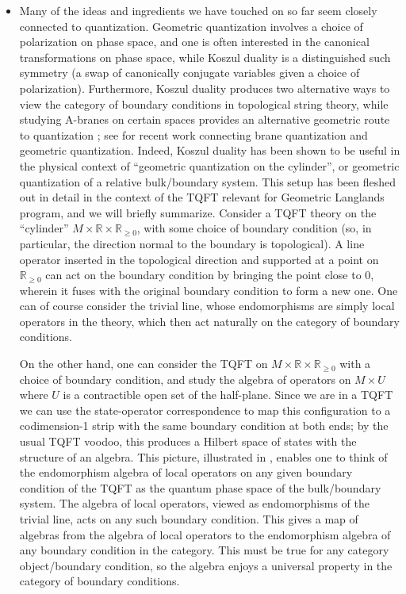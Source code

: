 \documentclass[11pt]{amsart}
\begin{document}
\begin{itemize}
\item Many of the ideas and ingredients we have touched on so far seem closely connected to quantization. Geometric quantization involves a choice of polarization on phase space, and one is often interested in the canonical transformations on phase space, while Koszul duality is a distinguished such symmetry (a swap of canonically conjugate variables given a choice of polarization). Furthermore, Koszul duality produces two alternative ways to view the category of boundary conditions in topological string theory, while studying A-branes on certain spaces provides an alternative geometric route to quantization \cite{GukovWitten}; see \cite{GW} for recent work connecting brane quantization and geometric quantization. Indeed, Koszul duality has been shown to be useful in the physical context of ``geometric quantization on the cylinder'', or geometric quantization of a relative bulk/boundary system. This setup has been fleshed out in detail \cite{EY} in the context of the TQFT relevant for Geometric Langlands program, and we will briefly summarize. Consider a TQFT theory on the ``cylinder'' $M \times \mathbb{R} \times \mathbb{R}_{\geq 0}$, with some choice of boundary condition (so, in particular, the direction normal to the boundary is topological). A line operator inserted in the topological direction and supported at a point on $\mathbb{R}_{\geq 0}$ can act on the boundary condition by bringing the point close to 0, wherein it fuses with the original boundary condition to form a new one. One can of course consider the trivial line, whose endomorphisms are simply local operators in the theory, which then act naturally on the category of boundary conditions. 

On the other hand, one can consider the TQFT on $M \times \mathbb{R} \times \mathbb{R}_{\geq 0}$ with a choice of boundary condition, and study the algebra of operators on $M \times U$ where $U$ is a contractible open set of the half-plane. Since we are in a TQFT we can use the state-operator correspondence to map this configuration to a codimension-1 strip with the same boundary condition at both ends; by the usual TQFT voodoo, this produces a Hilbert space of states with the structure of an algebra. This picture, illustrated in \cite{EY}, enables one to think of the endomorphism algebra of local operators on any given boundary condition of the TQFT as the quantum phase space of the bulk/boundary system. The algebra of local operators, viewed as endomorphisms of the trivial line, acts on any such boundary condition. This gives a map of algebras from the algebra of local operators to the endomorphism algebra of any boundary condition in the category. This must be true for any category object/boundary condition, so the algebra enjoys a universal property in the category of boundary conditions.


\end{itemize}
\end{document}
